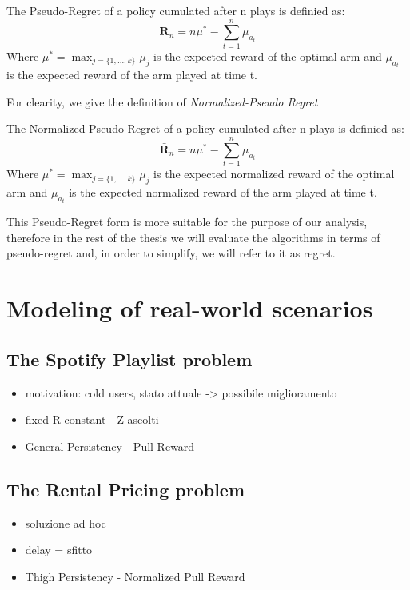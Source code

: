 \begin{definition}
	The Pseudo-Regret of a policy cumulated after n plays is definied as:
		$$\bm\bar{R}_{n}=n{\mu^{*}}- \sum_{t=1}^{n} \mu_{a_t}$$
	Where  $\mu^{*}=\max_{j = \{1,\dots,k\}} \mu_j$ is the expected reward of the optimal arm and $\mu_{a_t}$ is the expected reward of the arm played at time t.
\end{definition}
For clearity, we give the definition of \emph{Normalized-Pseudo Regret}
\begin{definition}
	The Normalized Pseudo-Regret of a policy cumulated after n plays is definied as:
	$$\bm\bar{R}_{n}=n{\mu^{*}}- \sum_{t=1}^{n} \mu_{a_t}$$
	Where  $\mu^{*}=\max_{j = \{1,\dots,k\}} \mu_j$ is the expected normalized reward of the optimal arm and $\mu_{a_t}$ is the expected normalized reward of the arm played at time t.
\end{definition}



This Pseudo-Regret form is more suitable for the purpose of our analysis, therefore in the rest of the thesis we will evaluate the algorithms in terms of pseudo-regret and, in order to simplify, we will refer to it as regret.



\section{Modeling of real-world scenarios}
\subsection{The Spotify Playlist problem}
\begin{itemize}
	\item motivation: cold users, stato attuale -> possibile miglioramento 
	\item fixed R constant - Z ascolti 
	\item General Persistency - Pull Reward
\end{itemize}
\subsection{The Rental Pricing problem}
\begin{itemize}
	\item soluzione ad hoc
	\item delay = sfitto 
	\item Thigh Persistency - Normalized Pull Reward
\end{itemize}
 	





